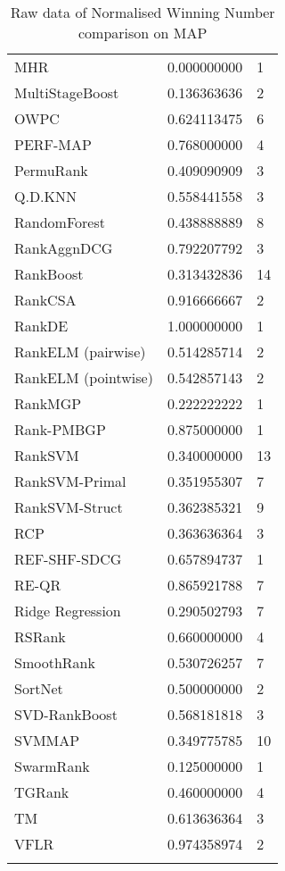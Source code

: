 \begin{longtable}{l|l|l}
MHR & 0.000000000 & 1 \\ 
MultiStageBoost & 0.136363636 & 2 \\ 
OWPC & 0.624113475 & 6 \\ 
PERF-\acs{MAP} & 0.768000000 & 4 \\ 
PermuRank & 0.409090909 & 3 \\ 
Q.D.\acs{KNN} & 0.558441558 & 3 \\ 
RandomForest & 0.438888889 & 8 \\ 
RankAgg\acs{nDCG} & 0.792207792 & 3 \\ 
RankBoost & 0.313432836 & 14 \\ 
RankCSA & 0.916666667 & 2 \\ 
RankDE & 1.000000000 & 1 \\ 
RankELM (pairwise) & 0.514285714 & 2 \\ 
RankELM (pointwise) & 0.542857143 & 2 \\ 
RankMGP & 0.222222222 & 1 \\ 
Rank-PMBGP & 0.875000000 & 1 \\ 
Rank\acs{SVM} & 0.340000000 & 13 \\ 
Rank\acs{SVM}-Primal & 0.351955307 & 7 \\ 
Rank\acs{SVM}-Struct & 0.362385321 & 9 \\ 
RCP & 0.363636364 & 3 \\ 
REF-SHF-SDCG & 0.657894737 & 1 \\ 
RE-QR & 0.865921788 & 7 \\ 
Ridge Regression & 0.290502793 & 7 \\ 
RSRank & 0.660000000 & 4 \\ 
SmoothRank & 0.530726257 & 7 \\ 
SortNet & 0.500000000 & 2 \\ 
\acs{SVD}-RankBoost & 0.568181818 & 3 \\ 
\acs{SVM}\acs{MAP} & 0.349775785 & 10 \\ 
SwarmRank & 0.125000000 & 1 \\ 
TGRank & 0.460000000 & 4 \\ 
TM & 0.613636364 & 3 \\ 
VFLR & 0.974358974 & 2 \\ 
\caption{Raw data of Normalised Winning Number comparison on \acs{MAP}}
\label{tab:raw_data_norm_winnum_map}
\end{longtable}